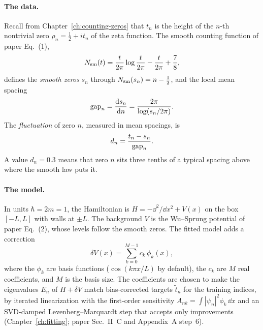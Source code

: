 \paragraph{The data.} Recall from Chapter~\ref{ch:counting-zeros} that $t_n$ is the height of the $n$-th nontrivial zero $\rho_n=\tfrac12+it_n$ of the zeta function. The smooth counting function of paper Eq.~(1),
\begin{equation}
N_{\mathrm{sm}}(t)=\frac{t}{2\pi}\log\frac{t}{2\pi}-\frac{t}{2\pi}+\frac78,
\label{eq:paper-memorization-nsm}
\end{equation}
defines the \emph{smooth zeros} $s_n$ through $N_{\mathrm{sm}}(s_n)=n-\tfrac12$, and the local mean spacing
\begin{equation}
\mathrm{gap}_n=\frac{\mathrm{d} s_n}{\mathrm{d} n}=\frac{2\pi}{\log(s_n/2\pi)} .
\label{eq:paper-memorization-gap}
\end{equation}
The \emph{fluctuation} of zero $n$, measured in mean spacings, is
\begin{equation}
d_n=\frac{t_n-s_n}{\mathrm{gap}_n}.
\label{eq:paper-memorization-fluct}
\end{equation}
A value $d_n=0.3$ means that zero $n$ sits three tenths of a typical spacing above where the smooth law puts it.

\paragraph{The model.} In units $\hbar=2m=1$, the Hamiltonian is $H=-\dd^2/\dd x^2+V(x)$ on the box $[-L,L]$ with walls at $\pm L$. The background $V$ is the Wu--Sprung potential of paper Eq.~(2), whose levels follow the smooth zeros. The fitted model adds a correction
\begin{equation}
\delta V(x)=\sum_{k=0}^{M-1}c_k\,\phi_k(x),
\label{eq:paper-memorization-dV}
\end{equation}
where the $\phi_k$ are basis functions ($\cos(k\pi x/L)$ by default), the $c_k$ are $M$ real coefficients, and $M$ is the basis size. The coefficients are chosen to make the eigenvalues $E_n$ of $H+\delta V$ match bias-corrected targets $\tilde t_n$ for the training indices, by iterated linearization with the first-order sensitivity $A_{nk}=\int|\psi_n|^2\phi_k\,\dd x$ and an SVD-damped Levenberg--Marquardt step that accepts only improvements (Chapter~\ref{ch:fitting}; paper Sec.~II~C and Appendix~A step~6).

